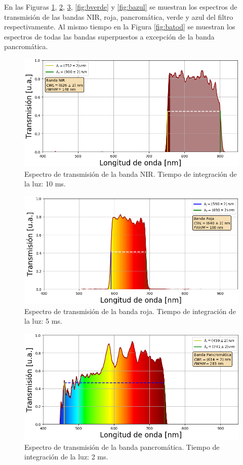 En las Figuras \ref{fig:bnir}, \ref{fig:broja}, \ref{fig:bpanc}, \ref{fig:bverde} y \ref{fig:bazul} se muestran los espectros de transmisión de las bandas NIR, roja, pancromática, verde y azul del filtro respectivamente. Al mismo tiempo en la Figura \ref{fig:batod} se muestran los espectros de todas las bandas superpuestos a excepción de la banda pancromática.
\begin{figure}[H]
	\centering
	\includegraphics[width=1.0\textwidth]{Figs/microespectrometro/espectro_nirt.png}
	\caption{Espectro de transmisión de la banda NIR. Tiempo de integración de la luz: 10 ms.}
	\label{fig:bnir}
\end{figure}
\begin{figure}[H]
	\centering
	\includegraphics[width=1.0\textwidth]{Figs/microespectrometro/espectro_rojat.png}
	\caption{Espectro de transmisión de la banda roja. Tiempo de integración de la luz: 5 ms.}
	\label{fig:broja}
\end{figure}
\begin{figure}[H]
	\centering
	\includegraphics[width=1.0\textwidth]{Figs/microespectrometro/espectro_pancromaticat.png}
	\caption{Espectro de transmisión de la banda pancromática. Tiempo de integración de la luz: 2 ms.}
	\label{fig:bpanc}
\end{figure}

